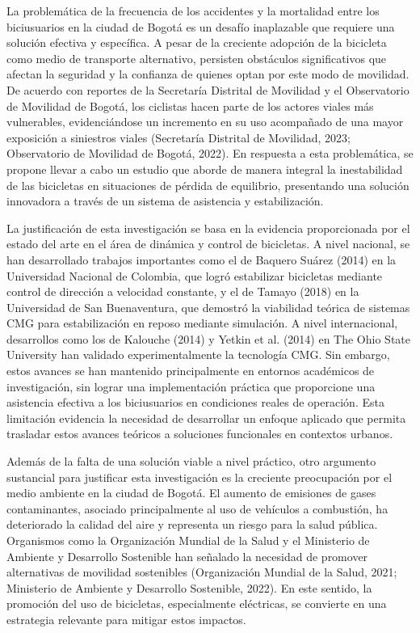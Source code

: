 \documentclass[12pt,letterpaper]{report}
\begin{document}
La problemática de la frecuencia de los accidentes y la mortalidad entre los biciusuarios en la ciudad de Bogotá es un desafío inaplazable que requiere una solución efectiva y específica. A pesar de la creciente adopción de la bicicleta como medio de transporte alternativo, persisten obstáculos significativos que afectan la seguridad y la confianza de quienes optan por este modo de movilidad. De acuerdo con reportes de la Secretaría Distrital de Movilidad y el Observatorio de Movilidad de Bogotá, los ciclistas hacen parte de los actores viales más vulnerables, evidenciándose un incremento en su uso acompañado de una mayor exposición a siniestros viales (Secretaría Distrital de Movilidad, 2023; Observatorio de Movilidad de Bogotá, 2022). En respuesta a esta problemática, se propone llevar a cabo un estudio que aborde de manera integral la inestabilidad de las bicicletas en situaciones de pérdida de equilibrio, presentando una solución innovadora a través de un sistema de asistencia y estabilización.

La justificación de esta investigación se basa en la evidencia proporcionada por el estado del arte en el área de dinámica y control de bicicletas. A nivel nacional, se han desarrollado trabajos importantes como el de Baquero Suárez (2014) en la Universidad Nacional de Colombia, que logró estabilizar bicicletas mediante control de dirección a velocidad constante, y el de Tamayo (2018) en la Universidad de San Buenaventura, que demostró la viabilidad teórica de sistemas CMG para estabilización en reposo mediante simulación. A nivel internacional, desarrollos como los de Kalouche (2014) y Yetkin et al. (2014) en The Ohio State University han validado experimentalmente la tecnología CMG. Sin embargo, estos avances se han mantenido principalmente en entornos académicos de investigación, sin lograr una implementación práctica que proporcione una asistencia efectiva a los biciusuarios en condiciones reales de operación. Esta limitación evidencia la necesidad de desarrollar un enfoque aplicado que permita trasladar estos avances teóricos a soluciones funcionales en contextos urbanos.

Además de la falta de una solución viable a nivel práctico, otro argumento sustancial para justificar esta investigación es la creciente preocupación por el medio ambiente en la ciudad de Bogotá. El aumento de emisiones de gases contaminantes, asociado principalmente al uso de vehículos a combustión, ha deteriorado la calidad del aire y representa un riesgo para la salud pública. Organismos como la Organización Mundial de la Salud y el Ministerio de Ambiente y Desarrollo Sostenible han señalado la necesidad de promover alternativas de movilidad sostenibles (Organización Mundial de la Salud, 2021; Ministerio de Ambiente y Desarrollo Sostenible, 2022). En este sentido, la promoción del uso de bicicletas, especialmente eléctricas, se convierte en una estrategia relevante para mitigar estos impactos.
\end{document}
